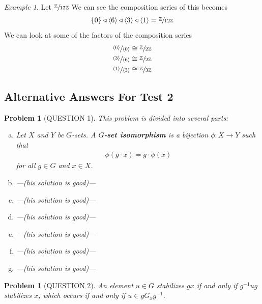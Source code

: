 \documentclass[titlepage]{article}
\theoremstyle{plain}
\newtheorem{problem}[theorem]{Problem}
\theoremstyle{definition}
\theoremstyle{remark}
\newtheorem{example}[remark]{Example}
\theoremstyle{exercise-style}
\numberwithin{equation}{section}
\numberwithin{theorem}{section}
\numberwithin{remark}{section}
\begin{document}
\begin{example}
    Let $\sfrac{\mathbb{Z}}{12 \mathbb{Z}}$ We can see the composition series of this becomes
    \begin{align}
        \{ 0 \}\triangleleft \langle 6 \rangle \triangleleft \langle 3 \rangle \triangleleft \langle 1 \rangle = \sfrac{\mathbb{Z}}{12 \mathbb{Z}}
    \end{align}
    We can look at some of the factors of the composition series
    \begin{align}
        \sfrac{\langle 6 \rangle}{ \langle 0 \rangle} & \cong \sfrac{\mathbb{Z}}{2 \mathbb{Z}} \\
        \sfrac{\langle 3 \rangle}{\langle 6 \rangle} &\cong \sfrac{\mathbb{Z}}{2 \mathbb{Z}} \\
        \sfrac{\langle 1 \rangle}{\langle 3 \rangle} &\cong \sfrac{\mathbb{Z}}{3\mathbb{Z}}
    \end{align}
\end{example}

\subsection{Alternative Answers For Test 2}

\begin{problem}[QUESTION 1]
    This problem is divided into several parts:
    \begin{enumerate}[(a)]
            \item Let $X$ and $Y$ be $G$-sets. A \textbf{$G$-set isomorphism} is a bijection $\phi: X \to Y$ such that
            \begin{align}
                \phi(g \cdot x) = g \cdot \phi(x)
            \end{align}
            for all $g \in G$ and $x \in X$.
            \item ---(his solution is good)---
            \item ---(his solution is good)---
            \item ---(his solution is good)---
            \item ---(his solution is good)---
            \item ---(his solution is good)---
            \item ---(his solution is good)---
    \end{enumerate}
\end{problem}

\begin{problem}[QUESTION 2]
    An element $u \in G$ stabilizes $gx$ if and only if $g^{-1} u g$ stabilizes $x$, 
    which occurs if and only if $u \in g G_x g^{-1}$.
\end{problem}
\end{document}
